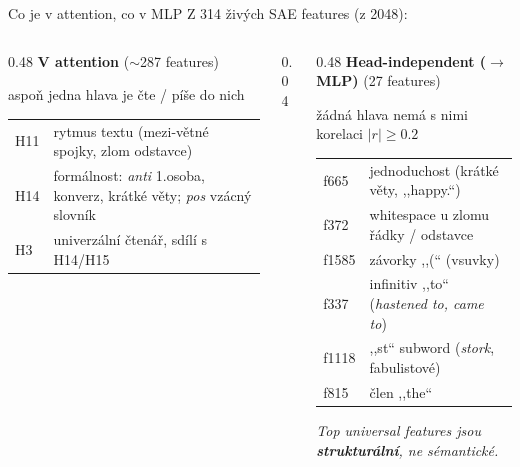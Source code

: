 \documentclass[aspectratio=169,10pt]{beamer}
\begin{document}
\begin{frame}[t]{Co je v attention, co v MLP}
  \vspace{2mm}
  {\footnotesize Z 314 živých SAE features (z 2048):}\par\vspace{4mm}
  \begin{columns}[T,onlytextwidth]
    \begin{column}{0.48\textwidth}
      \textbf{\color{accBlue}V attention} ($\sim$287 features)\par\vspace{1mm}
      {\footnotesize\color{mutedText}aspoň jedna hlava je čte / píše do nich}\par\vspace{3mm}
      {\footnotesize
      \begin{tabular}{@{}p{1.6cm}p{4.6cm}@{}}
        H11 & rytmus textu (mezi-větné spojky, zlom odstavce) \\[1mm]
        H14 & formálnost: \emph{anti} 1.osoba, konverz, krátké věty; \emph{pos} vzácný slovník \\[1mm]
        H3 & univerzální čtenář, sdílí s H14/H15 \\
      \end{tabular}
      }
    \end{column}
    \begin{column}{0.04\textwidth}\end{column}
    \begin{column}{0.48\textwidth}
      \textbf{\color{featTeal}Head-independent ($\to$ MLP)} (27 features)\par\vspace{1mm}
      {\footnotesize\color{mutedText}žádná hlava nemá s nimi korelaci $|r| \geq 0.2$}\par\vspace{3mm}
      {\footnotesize
      \begin{tabular}{@{}p{1.4cm}p{4.6cm}@{}}
        f665 & jednoduchost (krátké věty, ,,happy.``) \\
        f372 & whitespace u zlomu řádky / odstavce \\
        f1585 & závorky ,,(`` (vsuvky) \\
        f337 & infinitiv ,,to`` (\emph{hastened to, came to}) \\
        f1118 & ,,st`` subword (\emph{stork}, fabulistové) \\
        f815 & člen ,,the`` \\
      \end{tabular}
      }\par\vspace{3mm}
      {\scriptsize\color{mutedText}\itshape Top universal features jsou \textbf{strukturální}, ne sémantické.}
    \end{column}
  \end{columns}
\end{frame}
\end{document}
